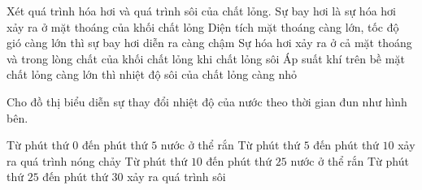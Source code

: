 \begin{ex}
Xét quá trình hóa hơi và quá trình sôi của chất lỏng.
\choiceTFt
{\True Sự bay hơi là sự hóa hơi xảy ra ở mặt thoáng của khối chất lỏng}
{Diện tích mặt thoáng càng lớn, tốc độ gió càng lớn thì sự bay hơi diễn ra càng chậm}
{\True Sự hóa hơi xảy ra ở cả mặt thoáng và trong lòng chất của khối chất lỏng khi chất lỏng sôi}
{Áp suất khí trên bề mặt chất lỏng càng lớn thì nhiệt độ sôi của chất lỏng càng nhỏ}
\loigiai{
\begin{itemize}
\item
\end{itemize}
}
\end{ex}
\begin{ex}
Cho đồ thị biểu diễn sự thay đổi nhiệt độ của nước theo thời gian đun như hình bên.
\begin{center} 
\end{center}
\choiceTFt
{\True Từ phút thứ $0$ đến phút thứ $5$ nước ở thể rắn}
{\True Từ phút thứ $5$ đến phút thứ $10$ xảy ra quá trình nóng chảy}
{Từ phút thứ $10$ đến phút thứ $25$ nước ở thể rắn}
{\True Từ phút thứ $25$ đến phút thứ $30$ xảy ra quá trình sôi}
\end{ex}
